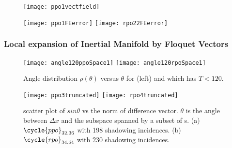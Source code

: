 \documentclass[mathserif, handout]{beamer}
\begin{document}
\begin{frame}[allowframebreaks]
  \begin{figure}[h]
    \centering
    \texttt{[image: ppo1vectfield]}
    \label{fig:ppo1vectorfield}
  \end{figure}

  \begin{figure}[h]
    \centering
    \texttt{[image: ppo1FEerror]} \hfill
    \texttt{[image: rpo22FEerror]}
    \label{fig:FEerror}
  \end{figure}

\end{frame}

\begin{frame}[allowframebreaks]
  \frametitle{Local expansion of Inertial Manifold by Floquet Vectors}

  \begin{figure}[h]
    \centering
    \texttt{[image: angle120ppoSpace1]} \hfill
    \texttt{[image: angle120rpoSpace1]}
    \caption{Angle distribution $\rho(\theta)$ versus $\theta$
      for  (left) and  which has $ T < 120$.
    }
    \label{fig:angDist}
  \end{figure}

  \begin{figure}[h]
    \centering
    \texttt{[image: ppo3truncated]} \hfill
    \texttt{[image: rpo4truncated]}
    \caption{
      scatter plot of $sin\theta$ vs the norm of difference vector.
      $\theta$ is the angle between $\Delta x$ and the subspace spanned
      by a subset of \Fv s.
      (a) $\cycle{ppo}_{32.36}$ with 198 shadowing incidences.
      (b) $\cycle{rpo}_{34.64}$ with 230 shadowing incidences.
    }
    \label{fig:angApproach}
  \end{figure}

\end{frame}
\end{document}
